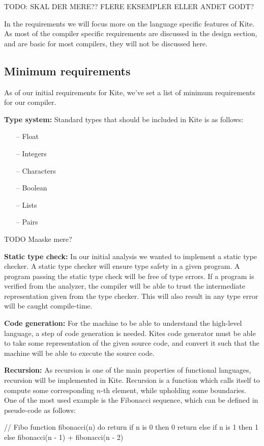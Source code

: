 TODO: SKAL DER MERE?? FLERE EKSEMPLER ELLER ANDET GODT?

In the requirements we will focus more on the language specific features of
Kite. As most of the compiler specific requirements are discussed in
the design section, and are basic for most compilers, they will not
be discussed here. 

\subsection{Minimum requirements}
As of our initial requirements for Kite, we've set a list of minimum
requirements for our compiler.

\textbf{Type system:} Standard types that should be included in Kite is as
follows:
\begin{itemize}
\item [--] Float
\item [--] Integers
\item [--] Characters
\item [--] Boolean
\item [--] Lists
\item [--] Pairs
\end{itemize}
TODO Maaske mere? 

\textbf{Static type check:} In our initial analysis we wanted to
implement a static type checker. A static type checker will ensure
type safety in a given program. A program passing the static type
check will be free of type errors. If a program is verified from the
analyzer, the compiler will be able to trust the intermediate
representation given from the type checker. This will also result in
any type error will be caught compile-time.

\textbf{Code generation:} For the machine to be able to understand the
high-level language, a step of code generation is needed. Kites code
generator must be able to take some representation of the given source
code, and convert it such that the machine will be able to execute the
source code.

\textbf{Recursion:} As recursion is one of the main properties of
functional languages, recursion will be implemented in Kite. Recursion
is a function which calls itself to compute some corresponding $n$-th
element, while upholding some boundaries. One of the most used example
is the Fibonacci sequence, which can be defined in pseude-code as
follows:
\begin{pseudo}
// Fibo
function fibonacci(n) do
  return if n is 0
    then 0
  return else if n is 1
    then 1
  else fibonacci(n - 1) + fibonacci(n - 2)
\end{pseudo}

